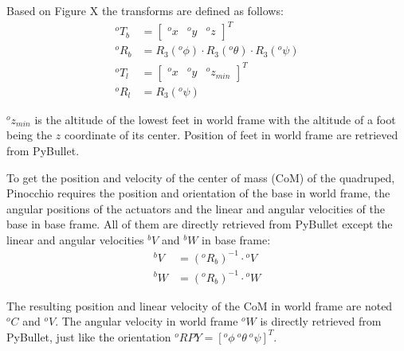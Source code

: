 \documentclass[a4paper,11pt]{article}
\begin{document}
Based on Figure X the transforms are defined as follows: 
\begin{align}
{}^o\!T_b &= \begin{bmatrix} {}^o\!x & {}^o\!y & {}^o\!z \end{bmatrix}^T \\
{}^o\!R_b &= R_3({}^o\phi) \cdot R_3({}^o\theta) \cdot R_3({}^o\psi) \\
{}^o\!T_l &= \begin{bmatrix} {}^o\!x & {}^o\!y & {}^o\!z_{min} \end{bmatrix}^T \label{eq:oMl_T}\\ 
{}^o\!R_l &= R_3({}^o\psi) \label{eq:oMl_R}
\end{align}


${}^o\!z_{min}$ is the altitude of the lowest feet in world frame with the altitude of a foot being the $z$ coordinate of its center. Position of feet in world frame are retrieved from PyBullet.

 
To get the position and velocity of the center of mass (CoM) of the quadruped, Pinocchio requires the position and orientation of the base in world frame, the angular positions of the actuators and the linear and angular velocities of the base in base frame. All of them are directly retrieved from PyBullet except the linear and angular velocities ${}^b\!V$ and ${}^b\!W$ in base frame: %
\begin{align}
{}^bV &= ({}^o\!R_b)^{-1} \cdot {}^oV \\
{}^bW &= ({}^o\!R_b)^{-1} \cdot {}^oW
\end{align}  

The resulting position and linear velocity of the CoM in world frame are noted ${}^o\!C$ and ${}^o\!V$. The angular velocity in world frame ${}^oW$ is directly retrieved from PyBullet, just like the orientation ${}^o\!RPY = [{}^o\!\phi ~ {}^o\!\theta ~ {}^o\!\psi]^T$.
\end{document}
